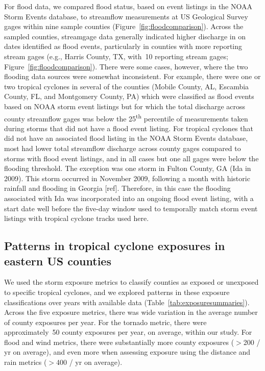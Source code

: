 For flood data, we compared flood status, based on event listings in the NOAA
Storm Events database, to streamflow measurements at \ac{US} Geological Survey
gages within nine sample counties (Figure~\ref{fig:floodcomparison}).  Across
the sampled counties, streamgage data generally indicated higher discharge in
on dates identified as flood events, particularly in counties with more
reporting stream gages (e.g., Harris County, TX, with~10 reporting stream
gages; Figure~\ref{fig:floodcomparison}). There were some cases, however, where
the two flooding data sources were somewhat inconsistent.  For example, there
were one or two tropical cyclones in several of the counties (Mobile County,
AL, Escambia County, FL, and Montgomery County, PA) which were classified as
flood events based on NOAA storm event listings but for which the total
discharge across county streamflow gages was below the 25\textsuperscript{th}
percentile of measurements taken during storms that did not have a flood event
listing. For tropical cyclones that did not have an associated flood listing in
the NOAA Storm Events database, most had lower total streamflow discharge
across county gages compared to storms with flood event listings, and in all
cases but one all gages were below the flooding threshold.  The exception was
one storm in Fulton County, GA (Ida in 2009). This storm occurred in November
2009, following a month with historic rainfall and flooding in Georgia [ref].
Therefore, in this case the flooding associated with Ida was incorporated into
an ongoing flood event listing, with a start date well before the five-day
window used to temporally match storm event listings with tropical cyclone
tracks used here. 

\subsection*{Patterns in tropical cyclone exposures in eastern \ac{US} counties}

We used the storm exposure metrics to classify counties as exposed or unexposed
to specific tropical cyclones, and we explored patterns in these exposure
classifications over years with available data
(Table~\ref{tab:exposuresummaries}). Across the five exposure metrics, there
was wide variation in the average number of county exposures per year. For the
tornado metric, there were approximately~50 county exposures per
year, on average, within our study.  For flood and wind metrics, there were
substantially more county exposures ($>$200 / yr on average), and
even more when assessing exposure using the distance and rain metrics ($>$400 /
yr on average). 

